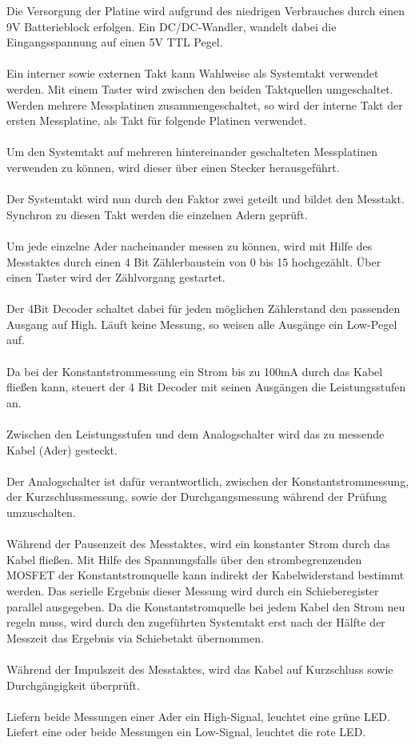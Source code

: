 Die Versorgung der Platine wird aufgrund des niedrigen Verbrauches durch einen 9V Batterieblock erfolgen. Ein DC/DC-Wandler, wandelt dabei die Eingangsspannung auf einen 5V TTL Pegel. 
\\
\\
Ein interner sowie externen Takt kann Wahlweise als Systemtakt verwendet werden. Mit einem Taster wird zwischen den beiden Taktquellen umgeschaltet. Werden mehrere Messplatinen zusammengeschaltet, so wird der interne Takt der ersten Messplatine, als Takt für folgende Platinen verwendet. 
\\
\\
Um den Systemtakt auf mehreren hintereinander geschalteten Messplatinen verwenden zu können, wird dieser über einen Stecker herausgeführt.
\\
\\
Der Systemtakt wird nun durch den Faktor zwei geteilt und bildet den Messtakt. Synchron zu diesen Takt werden die einzelnen Adern geprüft.
\\
\\
Um jede einzelne Ader nacheinander messen zu können, wird mit Hilfe des Messtaktes durch einen 4 Bit Zählerbaustein von 0 bis 15 hochgezählt. Über einen Taster wird der Zählvorgang gestartet.
\\
\\
Der 4Bit Decoder schaltet dabei für jeden möglichen Zählerstand den passenden Ausgang auf High. Läuft keine Messung, so weisen alle Ausgänge ein Low-Pegel auf. 
\\
\\
Da bei der Konstantstrommessung ein Strom bis zu 100mA durch das Kabel fließen kann, steuert der 4 Bit Decoder mit seinen Ausgängen die Leistungsstufen an.
\\
\\
Zwischen den Leistungsstufen und dem Analogschalter wird das zu messende Kabel  (Ader) gesteckt. 
\\
\\
Der Analogschalter ist dafür verantwortlich, zwischen der Konstantstrommessung, der Kurzschlussmessung, sowie der Durchgangsmessung während der Prüfung umzuschalten. 
\\
\\
Während der Pausenzeit des Messtaktes, wird ein konstanter Strom durch das Kabel fließen. Mit Hilfe des Spannungsfalls über den strombegrenzenden MOSFET der Konstantstromquelle kann indirekt der Kabelwiderstand bestimmt werden. Das serielle Ergebnis dieser  Messung wird durch ein Schieberegister parallel ausgegeben. Da die Konstantstromquelle bei jedem Kabel den Strom neu regeln muss, wird durch den zugeführten Systemtakt erst nach der Hälfte der Messzeit das Ergebnis via Schiebetakt übernommen.
\\
\\
Während der Impulszeit des Messtaktes, wird das Kabel auf Kurzschluss sowie Durchgängigkeit überprüft. 
\\
\\
Liefern beide Messungen einer Ader ein High-Signal, leuchtet eine grüne LED. Liefert eine oder beide Messungen ein Low-Signal, leuchtet die rote LED.
